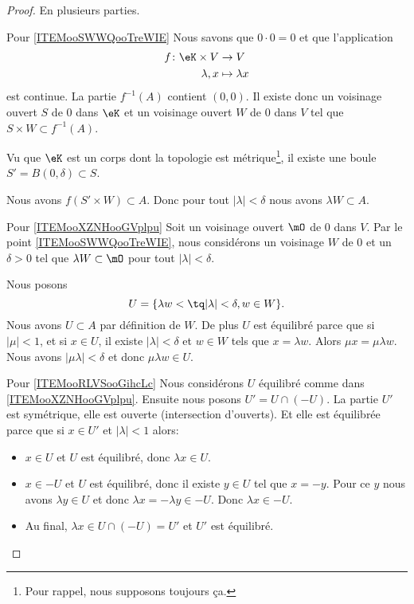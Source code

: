 \begin{proof}
    En plusieurs parties.
    \begin{subproof}
    \item[Pour \ref{ITEMooSWWQooTreWIE}]
    Nous savons que \( 0\cdot 0=0\) et que l'application
    \begin{equation}
        \begin{aligned}
            f\colon \eK\times V&\to V \\
            \lambda,x&\mapsto \lambda x 
        \end{aligned}
    \end{equation}
    est continue. La partie \( f^{-1}(A)\) contient \( (0,0)\). Il existe donc un voisinage ouvert \( S\) de \( 0\) dans \( \eK\) et un voisinage ouvert \( W\) de \( 0\) dans \( V\) tel que \( S\times W\subset f^{-1}(A)\).

    Vu que \( \eK\) est un corps dont la topologie est métrique\footnote{Pour rappel, nous supposons toujours ça.}, il existe une boule \( S'=B(0,\delta)\subset S\).

    Nous avons \( f(S'\times W)\subset A \). Donc pour tout \( | \lambda |<\delta\) nous avons \( \lambda W\subset A\).
\item[Pour \ref{ITEMooXZNHooGVplpu}]
    Soit un voisinage ouvert \( \mO\) de \( 0\) dans \( V\). Par le point \ref{ITEMooSWWQooTreWIE}, nous considérons un voisinage \( W\) de \( 0\) et un \( \delta>0\) tel que \( \lambda W\subset\mO\) pour tout \( | \lambda |<\delta\).

    Nous posons
    \begin{equation}
        U=\{\lambda w<\tq | \lambda |<\delta, w\in W\}.
    \end{equation}
    Nous avons \( U\subset A\) par définition de \( W\). De plus \( U\) est équilibré parce que si \( | \mu |<1\), et si \( x\in U\), il existe \( | \lambda |<\delta\) et \( w\in W\) tels que \( x=\lambda w\). Alors \( \mu x=\mu\lambda w\). Nous avons \( | \mu\lambda |<\delta\) et donc \( \mu\lambda w\in U\).
\item[Pour \ref{ITEMooRLVSooGihcLc}]
    Nous considérons \( U\) équilibré comme dans \ref{ITEMooXZNHooGVplpu}. Ensuite nous posons \( U'=U\cap (-U)\). La partie \( U'\) est symétrique, elle est ouverte (intersection d'ouverts). Et elle est équilibrée parce que si \( x\in U'\) et \( | \lambda |<1\) alors:
    \begin{itemize}
        \item \( x\in U\) et \( U\) est équilibré, donc \( \lambda x\in U\).
        \item \( x\in -U\) et \( U\) est équilibré, donc il existe \( y\in U\) tel que \( x=-y\). Pour ce \( y\) nous avons \( \lambda y\in U\) et donc \( \lambda x=-\lambda y\in -U\). Donc \( \lambda x\in -U\).
        \item Au final, \( \lambda x\in U\cap (-U)=U'\) et \( U'\) est équilibré.
    \end{itemize}
    \end{subproof}
\end{proof}

